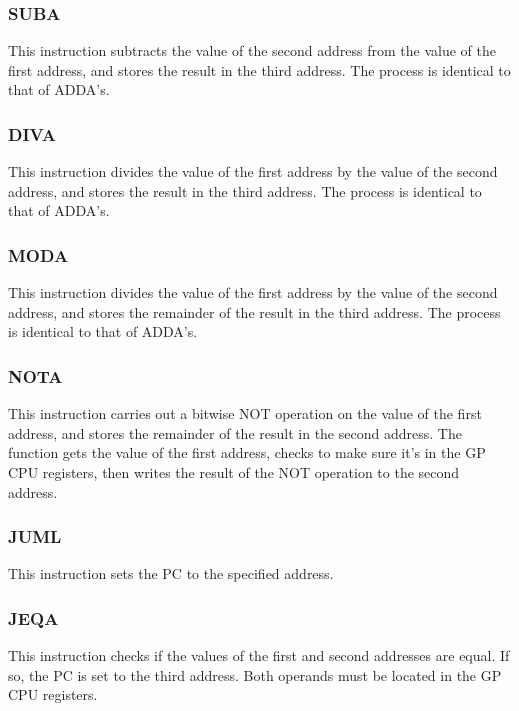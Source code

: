 \documentclass[a4paper,11pt]{article}
\begin{document}
        \subsubsection{SUBA}
            This instruction subtracts the value of the second address from the value of the first address, and stores the result in the third address. The process is identical to that of ADDA's.
            
        \subsubsection{DIVA}
            This instruction divides the value of the first address by the value of the second address, and stores the result in the third address. The process is identical to that of ADDA's.
            
        \subsubsection{MODA}
            This instruction divides the value of the first address by the value of the second address, and stores the remainder of the result in the third address. The process is identical to that of ADDA's.
            
        \subsubsection{NOTA}
            This instruction carries out a bitwise NOT operation on the value of the first address, and stores the remainder of the result in the second address. The function gets the value of the first address, checks to make sure it's in the GP CPU registers, then writes the result of the NOT operation to the second address.
            
        \subsubsection{JUML}
            This instruction sets the PC to the specified address.
            
        \subsubsection{JEQA}
            This instruction checks if the values of the first and second addresses are equal. If so, the PC is set to the third address. Both operands must be located in the GP CPU registers.
            
\end{document}
